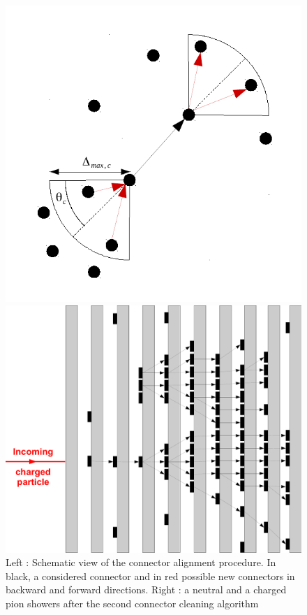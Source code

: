 \documentclass[cits]{JINST}
\begin{document}
\begin{figure}[!h]
  \begin{minipage}{0.4\linewidth}
    \begin{center}
      \includegraphics[width=0.8\linewidth]{ConnectorAlignment.pdf}
    \end{center}
  \end{minipage}
  \begin{minipage}{0.58\linewidth}
    \begin{center}
      \includegraphics[width=0.8\linewidth]{ConnectorCleaning2.pdf}
    \end{center}
  \end{minipage}
  \caption{\label{ARBOR_CONNECTOR_ALIGNEMENT} \label{ARBOR_CONNECTOR_CLEANING_2} Left : Schematic view of the connector alignment procedure. In black, a considered connector and in red possible new connectors in backward and forward directions. Right : a neutral and a charged pion showers after the second connector cleaning algorithm}
\end{figure}
\end{document}

